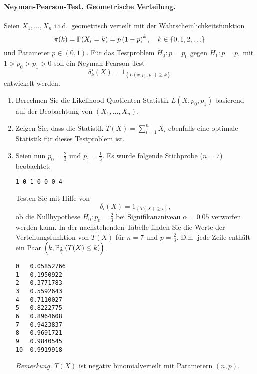 \paragraph{Neyman-Pearson-Test. Geometrische Verteilung. } Seien $X_1,\ldots,X_n$ 
i.i.d.\ geometrisch verteilt mit der Wahrscheinlichkeitsfunktion
\begin{equation}
    \pi(k) = \mathbb P(X_i = k) = p \left( 1-p \right)^k, \quad k\in\left\{ 0,1,2, \ldots \right\}
\end{equation}
und Parameter $p\in \left( 0,1 \right)$.
Für das Testproblem $H_0 : p=p_0$ gegen $H_1 : p=p_1$ mit $1>p_0 > p_1 >0$ 
soll ein Neyman-Pearson-Test
\begin{equation}
    \delta_k^\star (X) = 1_{ \left\{ L(x,p_0,p_1)\geq k \right\}  }
\end{equation}
entwickelt werden.
\begin{enumerate}
    \item Berechnen Sie die Likelihood-Quotienten-Statistik $L(X,p_0,p_1)$ basierend auf der
        Beobachtung von $\left( X_1,\ldots,X_n \right)$.
    \item Zeigen Sie, dass die Statistik $T(X)= \sum_{i=1}^{n} X_i$ ebenfalls eine
        optimale Statistik für dieses Testproblem ist.
    \item Seien nun $p_0=\frac{2}{3}$ und $p_1=\frac{1}{3}$. Es wurde folgende Stichprobe ($n=7$) beobachtet:
        \begin{lstlisting}
1 0 1 0 0 0 4
        \end{lstlisting}   %
        Testen Sie mit Hilfe von 
        \begin{equation}
            \delta_l(X) = 1_{   \left\{ T(X) \geq l \right\}},
        \end{equation}
        ob die Nullhypothese $H_0 : p_0=\frac{2}{3}$ bei Signifikanzniveau $\alpha=0.05$
        verworfen werden kann. In der nachstehenden Tabelle finden Sie die Werte der Verteilungsfunktion
        von $T(X)$ für $n=7$ und $p=\frac{2}{3}$. D.h.\ jede Zeile enthält ein Paar 
        $\left( k, \mathbb P_{\frac{2}{3}} \left( T(X) \leq k \right) \right)$.
        \begin{lstlisting}
0   0.05852766
1   0.1950922
2   0.3771783
3   0.5592643
4   0.7110027
5   0.8222775
6   0.8964608
7   0.9423837
8   0.9691721
9   0.9840545
10  0.9919918
\end{lstlisting}   %
\emph{Bemerkung.} $T(X)$ ist negativ binomialverteilt mit Parametern $\left( n,p \right)$.
\end{enumerate}


